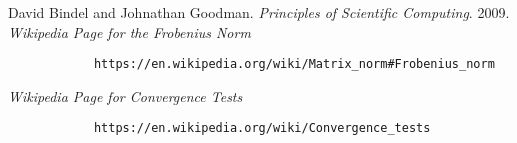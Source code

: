 \documentclass{article}
\begin{document}
	\begin{thebibliography}{2}
		David Bindel and Johnathan Goodman.
		\textit{Principles of Scientific Computing}. 
		2009.
		\textit{Wikipedia Page for the Frobenius Norm}
		\begin{verbatim}
			https://en.wikipedia.org/wiki/Matrix_norm#Frobenius_norm
		\end{verbatim}
		\textit{Wikipedia Page for Convergence Tests}
		\begin{verbatim}
			https://en.wikipedia.org/wiki/Convergence_tests
		\end{verbatim}
		
	\end{thebibliography}
	
	
	 
\end{document}
